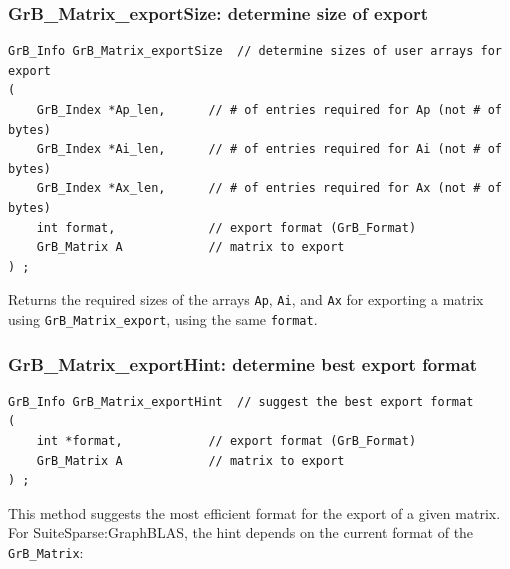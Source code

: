 \newpage
\subsubsection{{\sf GrB\_Matrix\_exportSize:} determine size of export}
\label{export_size}

\begin{mdframed}[userdefinedwidth=6in]
{\footnotesize
\begin{verbatim}
GrB_Info GrB_Matrix_exportSize  // determine sizes of user arrays for export
(
    GrB_Index *Ap_len,      // # of entries required for Ap (not # of bytes)
    GrB_Index *Ai_len,      // # of entries required for Ai (not # of bytes)
    GrB_Index *Ax_len,      // # of entries required for Ax (not # of bytes)
    int format,             // export format (GrB_Format)
    GrB_Matrix A            // matrix to export
) ;
\end{verbatim}
} \end{mdframed}

Returns the required sizes of the arrays \verb'Ap', \verb'Ai', and \verb'Ax'
for exporting a matrix using \verb'GrB_Matrix_export', using the same
\verb'format'.

\subsubsection{{\sf GrB\_Matrix\_exportHint:} determine best export format}
\label{export_hint}

\begin{mdframed}[userdefinedwidth=6in]
{\footnotesize
\begin{verbatim}
GrB_Info GrB_Matrix_exportHint  // suggest the best export format
(
    int *format,            // export format (GrB_Format)
    GrB_Matrix A            // matrix to export
) ;
\end{verbatim}
} \end{mdframed}

This method suggests the most efficient format for the export of a given
matrix.  For SuiteSparse:GraphBLAS, the hint depends on the current
format of the \verb'GrB_Matrix':

